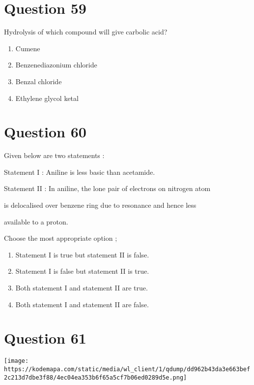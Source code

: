 \documentclass{article}
\begin{document}
\section*{Question 59}
Hydrolysis of which compound will give carbolic acid?


\begin{enumerate}[label=(\alph*)]
\item Cumene


\item Benzenediazonium chloride


\item Benzal chloride


\item Ethylene glycol ketal


\end{enumerate}
\newpage
\section*{Question 60}
Given below are two statements :



Statement I : Aniline is less basic than acetamide.



Statement II : In aniline, the lone pair of electrons on nitrogen atom

is delocalised over benzene ring due to resonance and hence less

available to a proton.



Choose the most appropriate option ;


\begin{enumerate}[label=(\alph*)]
\item Statement I is true but statement II is false.


\item Statement I is false but statement II is true.


\item Both statement I and statement II are true.


\item Both statement I and statement II are false.


\end{enumerate}
\newpage
\section*{Question 61}
\texttt{[image: https://kodemapa.com/static/media/wl\_client/1/qdump/dd962b43da3e663bef2c213d7dbe3f88/4ec04ea353b6f65a5cf7b06ed0289d5e.png]}\\
\end{document}
